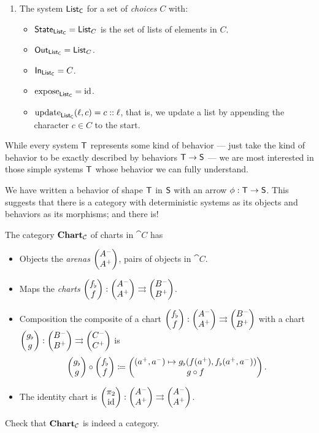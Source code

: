\documentclass[DynamicalBook]{subfiles}
\begin{document}
{\begin{exercise}
\begin{enumerate}
\begin{itemize}
\[\begin{aligned}
        &\update{XOR}(\false, \false) &= \false.
          \end{aligned}\]
    \end{itemize}
  \item The system $\mathsf{List_C}$ for a set of \emph{choices} $C$ with:
    \begin{itemize}
      \item $\mathsf{State}_{\mathsf{List_C}} = \mathsf{List}_C$ is the set of lists of elements in
        $C$.
      \item $\mathsf{Out}_{\mathsf{List_C}} = \mathsf{List}_C$.
      \item $\mathsf{In}_{\mathsf{List_C}} = C$.
      \item $\mathrm{expose}_{\mathsf{List_C}} = \mathrm{id}$.
      \item $\mathrm{update}_{\mathsf{List_C}}(\ell, c) = c::\ell$, that is, we update a list by
        appending the character $c \in C$ to the start.
    \end{itemize}
  \end{enumerate}
\end{exercise}

While every system $\mathsf{T}$ represents some kind of behavior --- just take the kind of
behavior to be exactly described by behaviors $\mathsf{T} \to \mathsf{S}$ --- we are
most interested in those simple systems $\mathsf{T}$ whose behavior we can fully
understand. 


We have written a behavior of shape $\mathsf{T}$ in $\mathsf{S}$ with an arrow $\phi :
\mathsf{T} \to \mathsf{S}$. This suggests that there is a category with deterministic
systems as its objects and behaviors as its morphisms; and there is!

\begin{definition}\label{def.category_of_charts}
  The category $\textbf{Chart}_{\mathcal{C}}$ of charts in $\cat{C}$ has
  \begin{itemize}
    \item Objects the \emph{arenas} $\begin{pmatrix}{A^-} \\ {A^+} \end{pmatrix}$, pairs of objects in $\cat{C}$.
    \item Maps the \emph{charts} $\begin{pmatrix}{f_{\flat}} \\ {f} \end{pmatrix} : \begin{pmatrix}{A^-} \\ {A^+} \end{pmatrix}
      \rightrightarrows \begin{pmatrix}{B^-} \\ {B^+} \end{pmatrix}$.
    \item Composition the composite of a chart $\begin{pmatrix}{f_{\flat}} \\ {f} \end{pmatrix} : \begin{pmatrix}{A^-} \\ {A^+} \end{pmatrix}
      \rightrightarrows \begin{pmatrix}{B^-} \\ {B^+} \end{pmatrix}$ with a chart $\begin{pmatrix}{g_{\flat}} \\ {g} \end{pmatrix} : \begin{pmatrix}{B^-} \\ {B^+} \end{pmatrix}
      \rightrightarrows \begin{pmatrix}{C^-} \\ {C^+} \end{pmatrix}$ is 
$$\begin{pmatrix}{g_{\flat}} \\ {g} \end{pmatrix} \circ \begin{pmatrix}{f_{\flat}} \\ {f} \end{pmatrix} \coloneqq \begin{pmatrix}{(a^+, a^-)
  \mapsto g_{\flat}(f(a^+), f_{\flat}(a^+, a^-))} \\ {g \circ f} \end{pmatrix}.$$
     \item The identity chart is $\begin{pmatrix}{\pi_2} \\ {\mathrm{id}} \end{pmatrix} : \begin{pmatrix}{A^-} \\ {A^+} \end{pmatrix}
       \rightrightarrows \begin{pmatrix}{A^-} \\ {A^+} \end{pmatrix}$.
  \end{itemize}
\end{definition}
\begin{exercise}
  Check that $\textbf{Chart}_{\mathcal{C}}$ is indeed a category.
\end{exercise}

}
\end{document}

